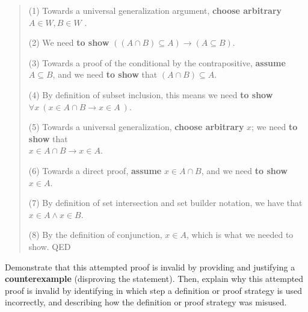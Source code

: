 \documentclass[12pt, oneside]{article}
\begin{document}
\begin{enumerate}[labelindent=0pt, leftmargin=0pt]
\begin{enumerate}
    \begin{quote}
    (1) Towards a universal generalization argument, {\bf choose arbitrary} $A \in W, B \in W$ .
    
    (2) We need {\bf to show} $((A \cap B) \subseteq A) \to (A \subseteq B)$.
    
    (3) Towards a proof of the conditional by the contrapositive, {\bf assume} $A \subseteq B$, and we need {\bf to show} 
    that $(A \cap B) \subseteq A$.
    
    (4) By definition of subset inclusion, this means we need {\bf to show} 
    $\forall x ~( x \in A \cap B \to  x \in A  ~)$.
    
    (5) Towards a universal generalization, {\bf choose arbitrary} $x$; we need {\bf to show} that \\
    $x \in A \cap B \to x \in A$.
    
    (6) Towards a direct proof, {\bf assume} $x \in A \cap B$, and we need {\bf to show } $x \in A$.
    
    (7) By definition of set intersection and set builder notation, we have that $x \in A \land x \in B$.
    
    (8) By the definition of conjunction, $x \in A$, which is  what we needed to show. QED
    \end{quote}
    
    Demonstrate that this attempted proof is invalid by providing
    and justifying a {\bf counterexample} (disproving the statement).
    Then, explain why this attempted proof is 
    invalid by identifying in which step a definition or proof strategy is used incorrectly, and describing how the 
    definition or proof strategy was misused.


\end{enumerate}
\end{enumerate}
\end{document}

